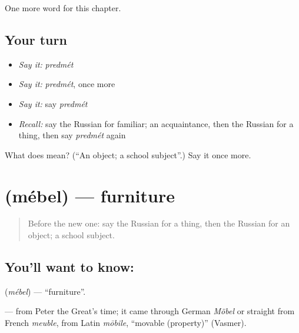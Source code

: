 \begin{grammarlens}[title={What you've built}]
One more word for this chapter.
\end{grammarlens}

\subsection*{Your turn}
\begin{itemize}
\raggedright
  \item \emph{Say it:} \emph{predmét}
  \item \emph{Say it:} \emph{predmét}, once more
  \item \emph{Say it:} say \emph{predmét}
  \item \emph{Recall:} say the Russian for familiar; an acquaintance, then the Russian for a thing, then say \emph{predmét} again
\end{itemize}

\begin{tcolorbox}[breakable,colback=teal!4,colframe=teal!35!black,title={Before you move on}]
What does  mean? (\textquotedblleft{}An object; a school subject\textquotedblright{}.) Say it once more.
\end{tcolorbox}
\section[\texorpdfstring{\ru{мебель} (mébel)}{мебель (mébel)}]{ (mébel) — furniture}

\label{lesson:RU-C159-mebel}



\begin{quote}
Before the new one: say the Russian for a thing, then the Russian for an object; a school subject.
\end{quote}

\subsection*{You'll want to know: }
\textbf{} (\emph{mébel}) — \textquotedblleft{}furniture\textquotedblright{}.

\begin{cousinweb}
\textbf{} — from Peter the Great's time; it came through German \emph{Möbel} or straight from French \emph{meuble}, from Latin \emph{mōbile}, \textquotedblleft{}movable (property)\textquotedblright{} (Vasmer).
\end{cousinweb}

